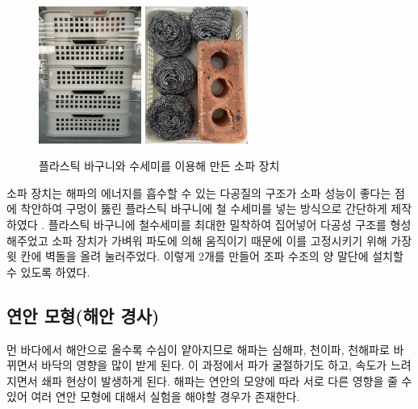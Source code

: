\begin{figure}[h]
	\begin{center}
		\includegraphics[width=0.3\textwidth]{images/sopagi1.jpg}
		\includegraphics[width=0.3\textwidth]{images/sopagi2.jpg}
		\caption{플라스틱 바구니와 수세미를 이용해 만든 소파 장치}
		\label{Waveabsorber}
	\end{center}
\end{figure}

소파 장치는 해파의 에너지를 흡수할 수 있는 다공질의 구조가 소파 성능이 좋다는 점에 착안하여 구멍이 뚫린 플라스틱 바구니에 철 수세미를 넣는 방식으로 간단하게 제작하였다 \cite{lim2014optimum, o2017methods}. 플라스틱 바구니에 철수세미를 최대한 밀착하여 집어넣어 다공성 구조를 형성해주었고 소파 장치가 가벼워 파도에 의해 움직이기 때문에 이를 고정시키기 위해 가장 윗 칸에 벽돌을 올려 눌러주었다. 이렇게 2개를 만들어 조파 수조의 양 말단에 설치할 수 있도록 하였다. 

\subsection{연안 모형(해안 경사)}

먼 바다에서 해안으로 올수록 수심이 얕아지므로 해파는 심해파, 천이파, 천해파로 바뀌면서 바닥의 영향을 많이 받게 된다. 이 과정에서 파가 굴절하기도 하고, 속도가 느려지면서 쇄파 현상이 발생하게 된다. 해파는 연안의 모양에 따라 서로 다른 영향을 줄 수 있어 여러 연안 모형에 대해서 실험을 해야할 경우가 존재한다.


